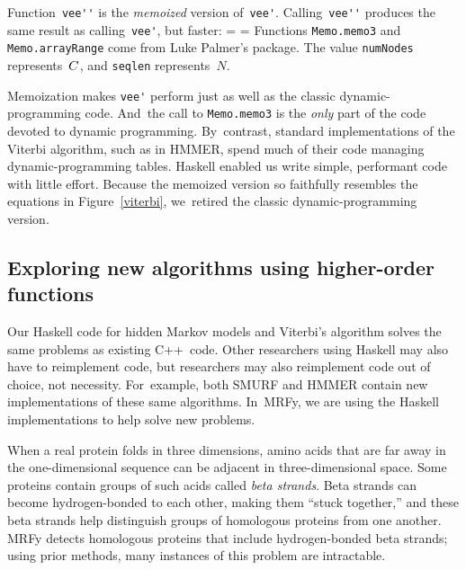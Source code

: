 \documentclass[nonatbib,preprint,blockstyle,times]{sigplanconf}
\newcommand\alignwidth{\ensuremath C} %
\newcommand\figref[1]{Figure~\ref{#1}}
\newcommand\seclabel[1]{\label{sec:#1}}
\newif\ifverbatimsmall
\newcommand\smallverbatiminput[1]{%
  \everypar=\expandafter{\the\everypar
       \verbatimsmallfalse
       \topsep=\standardvspace}%
  \topsep=0.78\topsep
  \verbatimsmalltrue}
\begin{document}
Function~\verb+vee''+ is the \emph{memoized} version of~\verb+vee'+.
Calling~\verb+vee''+ produces the same result as calling~\verb+vee'+,
but faster: 
\smallverbatiminput{memo}
Functions \texttt{Memo.memo3} and \texttt{Memo.arrayRange} come from
Luke Palmer's
 package.
The value
\texttt{numNodes} represents~$\alignwidth$,
and \texttt{seqlen} represents~$N$.

Memoization makes \verb+vee'+ perform just as well as the classic
dynamic-programming code.
And~the call to \texttt{Memo.memo3} is the \emph{only} part of the code
devoted to dynamic programming.
By~contrast, standard implementations of the Viterbi algorithm, such as in HMMER,
spend much of their code 
managing dynamic-programming tables.
Haskell enabled us write simple, performant code with little effort.
%
Because the memoized version so faithfully resembles the equations in
\figref{viterbi}, we~retired the classic dynamic-programming version.





\subsection{Exploring new algorithms using higher-order functions}

\seclabel{hofs}
\seclabel{mrfy}

Our Haskell code for hidden Markov models and Viterbi's algorithm
solves the same problems as existing C++~code.
Other researchers using Haskell may also have to reimplement code,
but researchers may also reimplement code out of choice, not
necessity.
For~example, both SMURF and HMMER contain new implementations of these
same algorithms.
In~MRFy, we are using the Haskell implementations to help solve new
problems. 

When a real protein folds in three dimensions, 
amino acids 
that are far away in the one-dimensional sequence can be
adjacent in three-dimensional space.
Some proteins contain groups of such acids called \emph{beta
strands}.
Beta strands
can become hydrogen-bonded to each other,
making them ``stuck together,''
and these beta strands help distinguish groups of homologous
proteins from one another.
MRFy detects homologous proteins that include hydrogen-bonded beta
strands; using prior methods, many instances of this problem are
intractable. 
\end{document}
